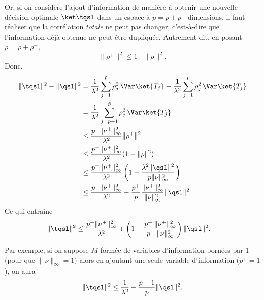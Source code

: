 Or, si on considère l'ajout d'information de manière à obtenir une nouvelle décision
optimale $\ket\tqsl$ dans un espace à $\tilde p = p + p^+$ dimensions, il faut réaliser
que la corrélation \textit{totale} ne peut pas changer, c'est-à-dire que l'information
déjà obtenue ne peut être dupliquée. Autrement dit, en posant $\tilde\rho = \rho + \rho^+$,
\begin{equation}
  \|\rho^+\|^2 \leq 1 - \|\rho\|^2.
\end{equation}
Donc,
\begin{align}
  \|\tqsl\|^2 - \|\qsl\|^2 &= \frac{1}{\lambda^2}\sum_{j=1}^{\tilde p}\rho_j^2\,\Var\ket{T_j} -
                             \frac{1}{\lambda^2}\sum_{j=1}^{p}\rho_j^2\,\Var\ket{T_j}\\
                           &= \frac{1}{\lambda^2}\sum_{j=p+1}^{\tilde p}\rho_j^2\,\Var\ket{T_j}\\
                           &\leq \frac{p^+\|\nu^+\|^2_\infty }{\lambda^2}\|\rho^+\|^2\\
                           &\leq \frac{p^+\|\nu^+\|^2_\infty }{\lambda^2}(1-\|\rho\|^2)\\
                           &\leq \frac{p^+\|\nu^+\|^2_\infty}{\lambda^2}\left(1-\frac{\lambda^2\|\qsl\|^2}{p\|\nu\|^2_\infty}\right)\\
                           &\leq \frac{p^+\|\nu^+\|^2_\infty}{\lambda^2}- \frac{p^+}{p}\frac{\|\nu^+\|^2_\infty}{\|\nu\|^2_\infty}\|\qsl\|^2
\end{align}
Ce qui entraîne
\begin{align}
  \|\tqsl\|^2 &\leq \frac{p^+\|\nu^+\|^2_\infty}{\lambda^2} + \left(1-\frac{p^+}{p}\frac{\|\nu^+\|^2_\infty}{\|\nu\|^2_\infty}\right)\|\qsl\|^2.
\end{align}

Par exemple, si on suppose $M$ formée de variables d'information bornées par 1 (pour que
$\|\nu\|_\infty = 1$) alors en ajoutant une seule variable d'information ($p^+=1$), on aura
\begin{equation}
  \|\tqsl\|^2 \leq \frac{1}{\lambda^2}+\frac{p-1}{p}\|\qsl\|^2.
\end{equation}

